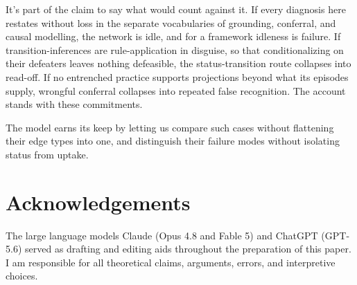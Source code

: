 \documentclass[12pt]{article}
\begin{document}
It's part of the claim to say what would count against it. If every diagnosis here restates without loss in the separate vocabularies of grounding, conferral, and causal modelling, the network is idle, and for a framework idleness is failure. If transition-inferences are rule-application in disguise, so that conditionalizing on their defeaters leaves nothing defeasible, the status-transition route collapses into read-off. If no entrenched practice supports projections beyond what its episodes supply, wrongful conferral collapses into repeated false recognition. The account stands with these commitments.

The model earns its keep by letting us compare such cases without flattening their edge types into one, and distinguish their failure modes without isolating status from uptake.

\section*{Acknowledgements}

The large language models Claude (Opus 4.8 and Fable 5) and ChatGPT (GPT-5.6) served as drafting and editing aids throughout the preparation of this paper. I am responsible for all theoretical claims, arguments, errors, and interpretive choices.

\newpage
\printbibliography
\end{document}
